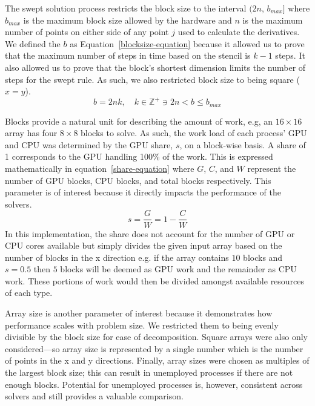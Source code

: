 \documentclass[journal,article,submit,moreauthors,pdftex]{Definitions/mdpi}
\begin{document}
\par 
The swept solution process restricts the block size to the interval $(2n,\,b_{max}]$ where $b_{max}$ is the maximum block size allowed by the hardware and $n$ is the maximum number of points on either side of any point $j$ used to calculate the derivatives. We defined the $b$ as Equation~\ref{blocksize-equation} because it allowed us to prove that the maximum number of steps in time based on the stencil is $k-1$ steps. It also allowed us to prove that the block's shortest dimension limits the number of steps for the swept rule. As such, we also restricted block size to being square ($x=y$).
\begin{equation}
    \label{blocksize-equation}
    b  = 2nk,\quad k\in\mathbb{Z}^{+}\ni 2n < b \leq b_{max}
\end{equation}

\par
Blocks provide a natural unit for describing the amount of work, e.g, an $16\times16$ array has four $8\times8$ blocks to solve. As such, the work load of each process' GPU and CPU was determined by the GPU share, $s$, on a block-wise basis. A share of 1 corresponds to the GPU handling 100\% of the work. This is expressed mathematically in equation~\ref{share-equation} where $G$, $C$, and $W$ represent the number of GPU blocks, CPU blocks, and total blocks respectively. This parameter is of interest because it directly impacts the performance of the solvers.
\begin{equation}
    \label{share-equation}
    s = \frac{G}{W} = 1-\frac{C}{W}
\end{equation}
In this implementation, the share does not account for the number of GPU or CPU cores available but simply divides the given input array based on the number of blocks in the x direction e.g. if the array contains $10$ blocks and $s=0.5$ then $5$ blocks will be deemed as GPU work and the remainder as CPU work. These portions of work would then be divided amongst available resources of each type. 

\par
Array size is another parameter of interest because it demonstrates how performance scales with problem size. We restricted them to being evenly divisible by the block size for ease of decomposition. Square arrays were also only considered---so array size is represented by a single number which is the number of points in the x and y directions. Finally, array sizes were chosen as multiples of the largest block size; this can result in unemployed processes if there are not enough blocks. Potential for unemployed processes is, however, consistent across solvers and still provides a valuable comparison.
\end{document}
